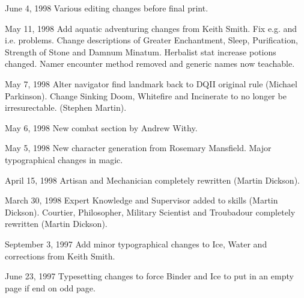 \begin{edition}{1.2}
\item[June 4, 1998] Various editing changes before final print.

\item[May 11, 1998] Add aquatic adventuring changes from Keith Smith.
Fix e.g. and i.e. problems.  Change descriptions of Greater
Enchantment, Sleep, Purification, Strength of Stone and Damnum
Minatum.  Herbalist stat increase potions changed.  Namer encounter
method removed and generic names now teachable.

\item[May 7, 1998] Alter navigator find landmark back to DQII original
rule (Michael Parkinson).  Change Sinking Doom, Whitefire and
Incinerate to no longer be irresurectable. (Stephen Martin).

\item[May 6, 1998] New combat section by Andrew Withy.

\item[May 5, 1998] New character generation from Rosemary Mansfield.
Major typographical changes in magic.

\item[April 15, 1998] Artisan and Mechanician completely rewritten
(Martin Dickson).

\item[March 30, 1998] Expert Knowledge and Supervisor added to skills
(Martin Dickson).  Courtier, Philosopher, Military Scientist and
Troubadour completely rewritten (Martin Dickson).

\item[September 3, 1997] Add minor typographical changes to Ice, Water
and corrections from Keith Smith.

\item[June 23, 1997] Typesetting changes to force Binder and Ice to
put in an empty page if end on odd page.

\end{edition}


